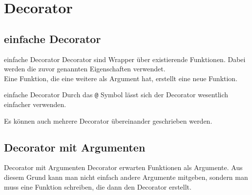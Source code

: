 \section{Decorator}
\subsection{einfache Decorator}
\begin{frame}{einfache Decorator}
	Decorator sind Wrapper über existierende Funktionen. Dabei werden die zuvor genannten Eigenschaften verwendet.\\
	Eine Funktion, die eine weitere als Argument hat, erstellt eine neue Funktion.
	
\end{frame}

\begin{frame}[fragile]{einfache Decorator}
	Durch das \texttt{@} Symbol lässt sich der Decorator wesentlich einfacher verwenden.
	
	Es können auch mehrere Decorator übereinander geschrieben werden.
\end{frame}

\subsection{Decorator mit Argumenten}
\begin{frame}{Decorator mit Argumenten}
	Decorator erwarten Funktionen als Argumente. Aus diesem Grund kann man nicht einfach andere Argumente mitgeben, sondern man muss eine Funktion schreiben, die dann den Decorator erstellt.
	
\end{frame}


